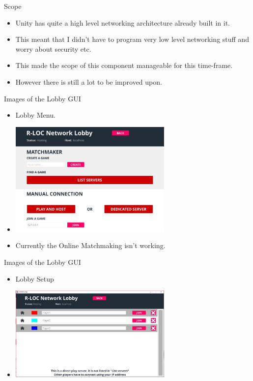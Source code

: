 \documentclass{beamer}
\begin{document}




















\begin{frame}{Scope}
	\begin{itemize}
		\item Unity has quite a high level networking architecture already built in it.  \pause
		\item This meant that I didn't have to program very low level networking stuff and worry about security etc. \pause
		\item This made the scope of this component manageable for this time-frame. \pause
		\item However there is still a lot to be improved upon.
	\end{itemize}
\end{frame}

\begin{frame}{Images of the Lobby GUI}
	\begin{itemize}
		\item Lobby Menu. \pause
		\item \includegraphics[width=8cm]{LobbyGUI} \pause
		\item Currently the Online Matchmaking isn't working.
	\end{itemize}
\end{frame}

\begin{frame}{Images of the Lobby GUI}
	\begin{itemize}
		\item Lobby Setup \pause
		\item \includegraphics[width=8cm]{LobbySetup}
	\end{itemize}
\end{frame}
\end{document}
